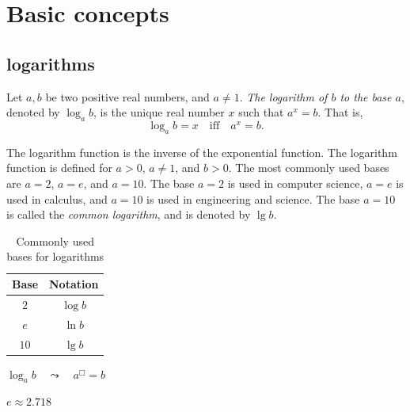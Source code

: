 \section{Basic concepts}


\subsection{logarithms}


\begin{df}[Logarithms]
    Let $a,b$ be two positive real numbers, 
    and $a \neq 1$. 
    \textit{The logarithm of $b$ to the base $a$},
    denoted by {\color{purple} $\log_a b$}, 
    is the unique real number $x$ such that $a^x = b$. 
    That is, 
    \[
        \log_a b = x \quad \text{iff} \quad a^x = b.
    \]
\end{df}

The logarithm function is the inverse of the exponential function. 
% 
The logarithm function is defined for $a>0$, $a \neq 1$, and $b>0$. 
% 
The most commonly used bases are $a=2$, $a=e$, and $a=10$. 
% 
The base $a=2$ is used in computer science, 
$a=e$ is used in calculus, 
and $a=10$ is used in engineering and science. 
The base $a=10$ is called the \textit{common logarithm}, 
and is denoted by $\lg b$.

\begin{table}[ht!]
    \centering
    \caption{Commonly used bases for logarithms}
    \label{tab: logarithm}
    \vspace{1em}
    \begin{tabular}{c||c}
        \hline
        Base & Notation \\
        \hline
        $2$ & {\color{purple} $\log b$} \\
        $e$ & $\ln b$ \\
        $10$ & $\lg b$ \\
        \hline
    \end{tabular}
\end{table}

$\log_a b \quad\leadsto\quad  a^\Box = b$

$e \approx 2.718$


